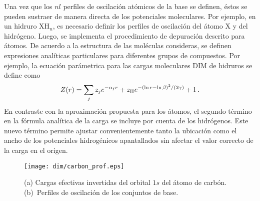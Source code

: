 Una vez que los $nl$ perfiles de oscilación atómicos de la base se 
definen, éstos se pueden sustraer de manera directa de los potenciales 
moleculares. Por ejemplo, en un hidruro XH$_n$, es necesario definir los 
perfiles de oscilación del átomo X y del hidrógeno. Luego, se implementa 
el procedimiento de depuración descrito para átomos. De acuerdo a la 
estructura de las moléculas consideras, se definen expresiones 
analíticas particulares para diferentes grupos de compuestos. Por 
ejemplo, la ecuación parámetrica para las cargas moleculares DIM de 
hidruros se define como
\begin{eqnarray}
 Z(r) = \sum_j z_j e^{-\alpha_j r} 
 + z_{\mbox{\scriptsize H}} e^{-(\ln r - \ln \beta)^2/(2\gamma)} 
 + 1\,.
 \label{eq:molzDIM}
\end{eqnarray}
En contraste con la aproximación propuesta para los átomos, el segundo 
término en la fórmula analítica de la carga se incluye por cuenta de los 
hidrógenos. Este nuevo término permite ajustar convenientemente tanto la 
ubicación como el ancho de los potenciales hidrogénicos apantallados sin 
afectar el valor correcto de la carga en el origen.

\begin{figure}[t]
\centering
\texttt{[image: dim/carbon\_prof.eps]}
\caption[Inversión de orbitales descritos con conjuntos de base finitos.]
{(a) Cargas efectivas invertidas del orbital $1s$ del átomo de carbón.
(b)~Perfiles de oscilación de los conjuntos de base.}
\label{fig:1sCarbon}
\end{figure}

